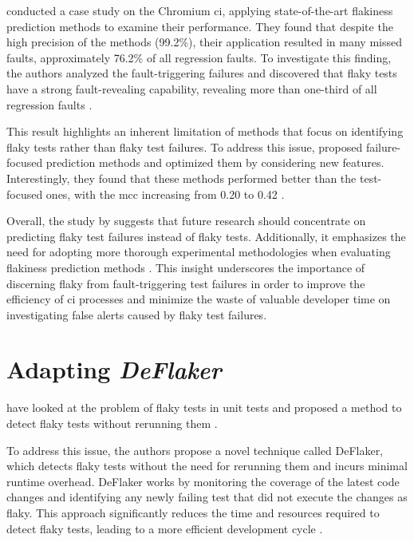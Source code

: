  conducted a case study on the Chromium \ac{ci}, applying state-of-the-art flakiness prediction methods to examine their performance.
They found that despite the high precision of the methods (99.2\%), their application resulted in many missed faults, approximately 76.2\% of all regression faults.
To investigate this finding, the authors analyzed the fault-triggering failures and discovered that flaky tests have a strong fault-revealing capability, revealing more than one-third of all regression faults \autocite{haben_importance_2023}.

This result highlights an inherent limitation of methods that focus on identifying flaky tests rather than flaky test failures.
To address this issue,  proposed failure-focused prediction methods and optimized them by considering new features.
Interestingly, they found that these methods performed better than the test-focused ones, with the \ac{mcc} increasing from 0.20 to 0.42 \autocite{haben_importance_2023}.

Overall, the study by \citeauthor*{haben_importance_2023} suggests that future research should concentrate on predicting flaky test failures instead of flaky tests.
Additionally, it emphasizes the need for adopting more thorough experimental methodologies when evaluating flakiness prediction methods \autocite{haben_importance_2023}.
This insight underscores the importance of discerning flaky from fault-triggering test failures in order to improve the efficiency of \ac{ci} processes and minimize the waste of valuable developer time on investigating false alerts caused by flaky test failures.

\section{Adapting \emph{DeFlaker}}

 have looked at the problem of flaky tests in unit tests and proposed a method to detect flaky tests without rerunning them \autocite{bell_deflaker_2018}.

To address this issue, the authors propose a novel technique called DeFlaker, which detects flaky tests without the need for rerunning them and incurs minimal runtime overhead.
DeFlaker works by monitoring the coverage of the latest code changes and identifying any newly failing test that did not execute the changes as flaky.
This approach significantly reduces the time and resources required to detect flaky tests, leading to a more efficient development cycle \autocite{bell_deflaker_2018}.

